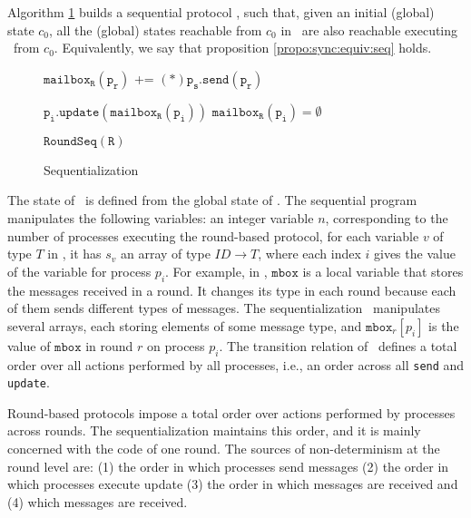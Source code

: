 Algorithm \ref{alg:seq} builds a sequential protocol \Pseq, such that, given an initial (global) state $c_0$, all the (global) states reachable from $c_0$ in \Psync\ are also reachable executing \Pseq\ from $c_0$. Equivalently, we say that proposition \ref{propo:sync:equiv:seq} holds.

\begin{figure}[h]
\begin{algorithm}[H]
\caption{Sequentialization}
\begin{algorithmic}[1]
\scriptsize

 
     \label{seq:recv2}
        \State $\mathtt{mailbox_R(p_r)}$ += $\mathtt{(*)p_s.send(p_r)}$ \label{seq:choose}
    \EndFor
\EndFor

 \label{seq:recv2} \label{seq:upd}
    \State $\mathtt{p_i.update(mailbox_R(p_i))}$
    \State $\mathtt{mailbox_R(p_i)=\emptyset}$
\EndFor

 
        \State $\mathtt{RoundSeq(R)}$
    \EndFor
\EndWhile
\end{algorithmic}
\label{alg:seq}
\end{algorithm}
\end{figure}

The state of \Pseq\ is defined from the global state of \Psync. The sequential program manipulates the following variables: an integer variable $n$, corresponding to the number of processes executing the round-based protocol, for each variable $v$ of type $T$ in \Psync, it has $s_v$ an array of type $\mathit{ID} \rightarrow T$, where each index $i$ gives the value of the variable for process $p_i$. 
For example, in \Psync, $\texttt{mbox}$ is a local variable that stores the messages received in a round. It changes its type in each round because each of them sends different types of messages. The sequentialization \Pseq\ manipulates several arrays, each storing elements of some message type, and $\texttt{mbox}_{r}[p_i]$ is the value of $\texttt{mbox}$ in round $r$ on process $p_i$. 
The transition relation of \Pseq\ defines a total order over all actions performed by all processes, i.e., an order across all \texttt{send} and \texttt{update}.
  
Round-based protocols impose a total order over actions performed by processes across rounds. 
The sequentialization maintains this order, and it is mainly concerned with the code of one round. 
The sources of non-determinism at the round level are: 
(1) the order in which processes send messages 
(2) the order in which processes execute update 
(3) the order in which messages are received and
(4) which messages are received.

